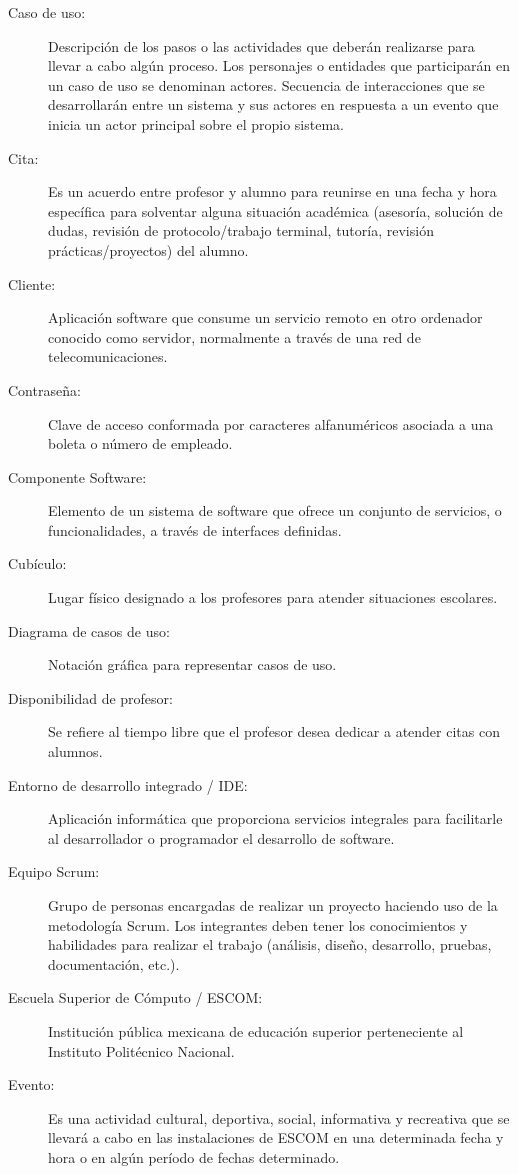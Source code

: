 \begin{description}
	\item[Caso de uso:] Descripción de los pasos o las actividades que deberán realizarse para llevar a cabo algún proceso. Los personajes o entidades que participarán en un caso de uso se denominan actores. Secuencia de interacciones que se desarrollarán entre un sistema y sus actores en respuesta a un evento que inicia un actor principal sobre el propio sistema.
	\item[Cita:] Es un acuerdo entre profesor y alumno para reunirse en una fecha y hora específica para solventar alguna situación académica (asesoría, solución de dudas, revisión de protocolo/trabajo terminal, tutoría, revisión prácticas/proyectos) del alumno.
	\item[Cliente:] Aplicación software que consume un servicio remoto en otro ordenador conocido como servidor, normalmente a través de una red de telecomunicaciones.
	\item[Contraseña:] Clave de acceso conformada por caracteres alfanuméricos asociada a una boleta o número de empleado.
	\item[Componente Software:] Elemento de un sistema de software que ofrece un conjunto de servicios, o funcionalidades, a través de interfaces definidas.
	\item[Cubículo:] Lugar físico designado a los profesores para atender situaciones escolares.

	\item[Diagrama de casos de uso:] Notación gráfica para representar casos de uso.
	\item[Disponibilidad de profesor:] Se refiere al tiempo libre que el profesor desea dedicar a atender citas con alumnos.
	
	\item[Entorno de desarrollo integrado / IDE:] Aplicación informática que proporciona servicios integrales para facilitarle al desarrollador o programador el desarrollo de software.
	\item[Equipo Scrum:] Grupo de personas encargadas de realizar un proyecto haciendo uso de la metodología Scrum. Los integrantes deben tener los conocimientos y habilidades para realizar el trabajo (análisis, diseño, desarrollo, pruebas, documentación, etc.).
	\item[Escuela Superior de Cómputo / ESCOM:] Institución pública mexicana de educación superior perteneciente al Instituto Politécnico Nacional.
	\item[Evento:] Es una actividad cultural, deportiva, social, informativa y recreativa que se llevará a cabo en las instalaciones de ESCOM en una determinada fecha y hora o en algún período de fechas determinado.


\end{description}
